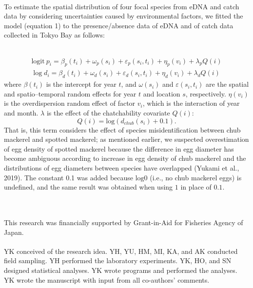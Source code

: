 \documentclass[12pt]{article}
\begin{document}
\begin{linenumbers}
\\
To estimate the spatial distribution of four focal species from eDNA and catch data by considering uncertainties caused by environmental factors, we fitted the model (equation 1) to the presence/absence data of eDNA and of catch data collected in Tokyo Bay as follows:



\\
\begin{equation}
\begin{array}{ll}
\mathrm{logit}\ p_{i} = \beta_{p}(t_{i}) + \omega_{p}(s_{i}) + \varepsilon_{p}(s_{i}, t_{i}) + \eta_{p}(v_{i}) + \lambda_{p}Q(i)\\
\log d_{i} = \beta_{d}(t_{i}) + \omega_{d}(s_{i}) + \varepsilon_{d}(s_{i}, t_{i}) + \eta_{d}(v_{i}) + \lambda_{d}Q(i)
\end{array}
\end{equation}
where $\beta(t_{i})$ is the intercept for year $t$, and $\omega(s_{i})$ and $\varepsilon(s_{i}, t_{i})$ are the spatial and spatio--temporal random effects for year $t$ and location $s$, respectively. $\eta(v_{i})$ is the overdispersion random effect of factor $v_{i}$, which is the interaction of year and month. 
$\lambda$ is the effect of the chatchability covariate $Q(i)$: 
\[
Q(i) = \mathrm{log} (d_{chub}(s_{i})+0.1). 
\]
That is, this term considers the effect of species misidentification between chub mackerel and spotted mackerel; as mentioned earlier, we suspected overestimation of egg density of spotted mackerel because the difference in egg diameter has become ambiguous according to increase in egg density of chub mackerel and the distributions of egg diameters between species have overlapped (Yukami et al., 2019). The constant 0.1 was added because $\mathrm{log} 0$ (i.e., no chub mackerel eggs) is undefined, and the same result was obtained when using $1$ in place of $0.1$.



\ \\
\\
This research was financially supported by Grant-in-Aid for Fisheries Agency of Japan.
\ \\

\\
YK conceived of the research idea. YH, YU, HM, MI, KA, and AK conducted field sampling. YH performed the laboratory experiments. YK, HO, and SN designed statistical analyses. YK wrote programs and performed the analyses. YK wrote the manuscript with input from all co-authors' comments.
\ \\


\end{linenumbers}
\end{document}
